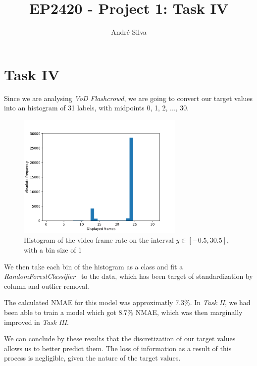 \documentclass[]{article}
\title{EP2420 - Project 1: Task IV}
\author{André Silva}
\begin{document}
\maketitle

\section{\textbf{Task IV}}
\label{sec:1}

Since we are analysing \textit{VoD Flashcrowd}, we are going to convert our target values into an histogram of 31 labels, with midpoints 0, 1, 2, ..., 30.

\begin{figure}[h!]
    \centering
    \captionsetup{justification=centering}
    \includegraphics[width=0.72\textwidth,height=\textheight,keepaspectratio]{../result/project1/discretized_frames_hist.pdf}
    \caption{Histogram of the video frame rate on the interval $y\in[-0.5,30.5]$, with a bin size of 1}
    \label{fig:1}
\end{figure}

We then take each bin of the histogram as a class and fit a \textit{RandomForestClassifier}~\cite{RFC} to the data, which has been target of standardization by column and outlier removal.

The calculated \textsc{NMAE} for this model was approximatly $7.3\%$. In \textit{Task II}, we had been able to train a model which got $8.7\%$ \textsc{NMAE}, which was then marginally improved in \textit{Task III}. 

We can conclude by these results that the discretization of our target values allows us to better predict them. The loss of information as a result of this process is negligible, given the nature of the target values.

\pagebreak
\end{document}

